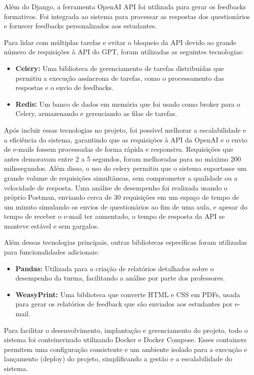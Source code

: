 Além do Django, a ferramenta OpenAI API foi utilizada para gerar os feedbacks formativos. Foi integrada ao sistema para processar as respostas dos questionários e fornecer feedbacks personalizados aos estudantes.

Para lidar com múltiplas tarefas e evitar o bloqueio da API devido ao grande número de requisições à API do GPT, foram utilizadas as seguintes tecnologias:

\begin{itemize}
    \item \textbf{Celery:} Uma biblioteca de gerenciamento de tarefas distribuídas que permitiu a execução assíncrona de tarefas, como o processamento das respostas e o envio de feedbacks.
    \item \textbf{Redis:} Um banco de dados em memória que foi usado como broker para o Celery, armazenando e gerenciando as filas de tarefas.
\end{itemize}

Após incluir essas tecnologias no projeto, foi possível melhorar a escalabilidade e a eficiência do sistema, garantindo que as requisições à API da OpenAI e o envio de e-mails fossem processadas de forma rápida e responsiva. Requisições que antes demoravam entre 2 a 5 segundos, foram melhoradas para no máximo 200 milissegundos. Além disso, o uso do celery permitiu que o sistema suportasse um grande volume de requisições simultâneas, sem comprometer a qualidade ou a velocidade de resposta. Uma análise de desempenho foi realizada usando o próprio Postman, enviando cerca de 30 requisições em um espaço de tempo de um minuto simulando os envios de questionários ao fim de uma aula, e apesar do tempo de receber o e-mail ter aumentado, o tempo de resposta da API se manteve estável e sem gargalos.

Além dessas tecnologias principais, outras bibliotecas específicas foram utilizadas para funcionalidades adicionais:

\begin{itemize}
    \item \textbf{Pandas:} Utilizada para a criação de relatórios detalhados sobre o desempenho da turma, facilitando a análise por parte dos professores.
    \item \textbf{WeasyPrint:} Uma biblioteca que converte HTML e CSS em PDFs, usada para gerar os relatórios de feedback que são enviados aos estudantes por e-mail.
\end{itemize}

Para facilitar o desenvolvimento, implantação e gerenciamento do projeto, todo o sistema foi conteinerizado utilizando Docker e Docker Compose. Esses containers permitem uma configuração consistente e um ambiente isolado para a execução e lançamento (deploy) do projeto, simplificando a gestão e a escalabilidade do sistema. 

